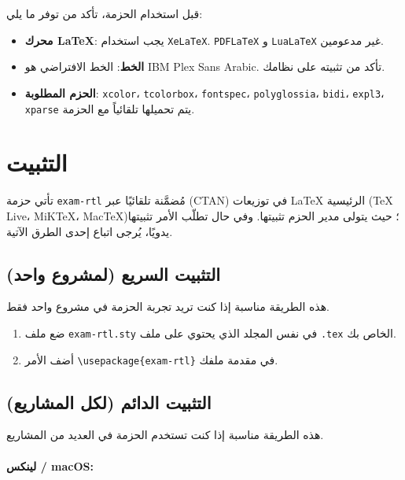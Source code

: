 \documentclass[a4paper]{article}
\newcommand{\engsf}[1]{\textenglish{\textsf{#1}}}
\newcommand{\engtt}[1]{\textenglish{\texttt{#1}}}
\begin{document}
قبل استخدام الحزمة، تأكد من توفر ما يلي:

\begin{itemize}
    \item \textbf{محرك \engsf{LaTeX}}: يجب استخدام \engtt{XeLaTeX}. \engtt{PDFLaTeX} و \engtt{LuaLaTeX} غير مدعومين.
    
    \item \textbf{الخط}: الخط الافتراضي هو \engsf{IBM Plex Sans Arabic}. تأكد من تثبيته على نظامك.
    
    \item \textbf{الحزم المطلوبة}: \engtt{xcolor}، \engtt{tcolorbox}، \engtt{fontspec}، \engtt{polyglossia}، \engtt{bidi}، \engtt{expl3}، \engtt{xparse} يتم تحميلها تلقائياً مع الحزمة.
\end{itemize}

\section{التثبيت}
تأتي حزمة \engtt{exam-rtl} مُضمَّنة تلقائيًا عبر \engsf{(CTAN)} في توزيعات LaTeX الرئيسية (\engsf{TeX Live}، \engsf{MiKTeX}، \engsf{MacTeX})؛ حيث يتولى مدير الحزم تثبيتها. وفي حال تطلّب الأمر تثبيتها يدويًا، يُرجى اتباع إحدى الطرق الآتية.

\subsection*{التثبيت السريع (لمشروع واحد)}

هذه الطريقة مناسبة إذا كنت تريد تجربة الحزمة في مشروع واحد فقط.

\begin{enumerate}
    \item ضع ملف \engtt{exam-rtl.sty} في نفس المجلد الذي يحتوي على ملف \engtt{.tex} الخاص بك.
    \item أضف الأمر \engtt{\textbackslash usepackage\{exam-rtl\}} في مقدمة ملفك.
\end{enumerate}

\subsection*{التثبيت الدائم (لكل المشاريع)}

هذه الطريقة مناسبة إذا كنت تستخدم الحزمة في العديد من المشاريع.

\paragraph*{لينكس / \engsf{macOS}:}
\end{document}
